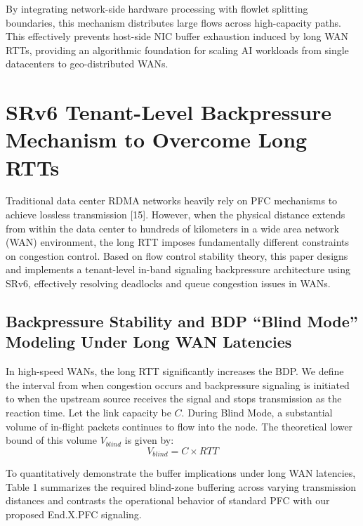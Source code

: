 \documentclass[a4paper]{jpconf}
\begin{document}
By integrating network-side hardware processing with flowlet splitting boundaries, this mechanism distributes large flows across high-capacity paths. This effectively prevents host-side NIC buffer exhaustion induced by long WAN RTTs, providing an algorithmic foundation for scaling AI workloads from single datacenters to geo-distributed WANs.


\section{SRv6 Tenant-Level Backpressure Mechanism to Overcome Long RTTs}


Traditional data center RDMA networks heavily rely on PFC mechanisms to achieve lossless transmission [15]. However, when the physical distance extends from within the data center to hundreds of kilometers in a wide area network (WAN) environment, the long RTT imposes fundamentally different constraints on congestion control. Based on flow control stability theory, this paper designs and implements a tenant-level in-band signaling backpressure architecture using SRv6, effectively resolving deadlocks and queue congestion issues in WANs.


\subsection{Backpressure Stability and BDP ``Blind Mode'' Modeling Under Long WAN Latencies}


In high-speed WANs, the long RTT significantly increases the BDP. We define the interval from when congestion occurs and backpressure signaling is initiated to when the upstream source receives the signal and stops transmission as the reaction time. Let the link capacity be $C$. During Blind Mode, a substantial volume of in-flight packets continues to flow into the node. The theoretical lower bound of this volume $V_{blind}$ is given by:
\begin{equation}
V_{blind} = C \times RTT
\end{equation}

To quantitatively demonstrate the buffer implications under long WAN latencies, Table 1 summarizes the required blind-zone buffering across varying transmission distances and contrasts the operational behavior of standard PFC with our proposed End.X.PFC signaling.
\end{document}
